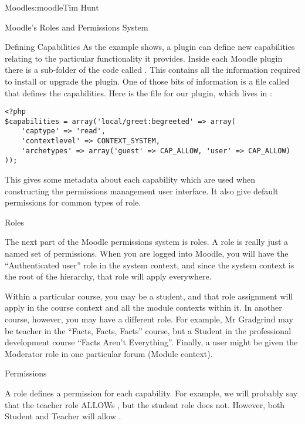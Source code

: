 \begin{aosachapter}{Moodle}{s:moodle}{Tim Hunt}
\begin{aosasect1}{Moodle's Roles and Permissions System}
\begin{aosasect2}{Defining Capabilities}
As the example shows, a plugin can define new capabilities relating
to the particular functionality it provides. Inside each Moodle
plugin there is a sub-folder of the code called . This
contains all the information required to install or upgrade the
plugin. One of those bits of information is a file called
 that defines the capabilities. Here is the
 file for our plugin, which lives in
:

\begin{verbatim}
<?php
$capabilities = array('local/greet:begreeted' => array(
    'captype' => 'read',
    'contextlevel' => CONTEXT_SYSTEM,
    'archetypes' => array('guest' => CAP_ALLOW, 'user' => CAP_ALLOW)
));
\end{verbatim}

This gives some metadata about each capability which are used when
constructing the permissions management user interface. It also give
default permissions for common types of role.

\end{aosasect2}

\begin{aosasect2}{Roles}

The next part of the Moodle permissions system is roles. A role is
really just a named set of permissions. When you are logged into
Moodle, you will have the ``Authenticated user'' role in the system
context, and since the system context is the root of the hierarchy,
that role will apply everywhere.

Within a particular course, you may be a student, and that role
assignment will apply in the course context and all the module
contexts within it. In another course, however, you may have a
different role. For example, Mr Gradgrind may be teacher in the
``Facts, Facts, Facts'' course, but a Student in the professional
development course ``Facts Aren't Everything''. Finally, a user might
be given the Moderator role in one particular forum (Module context).

\end{aosasect2}

\begin{aosasect2}{Permissions}

A role defines a permission for each capability. For example, we will
probably say that the teacher role ALLOWs ,
but the student role does not. However, both Student and Teacher will
allow .


\end{aosasect2}
\end{aosasect1}
\end{aosachapter}
